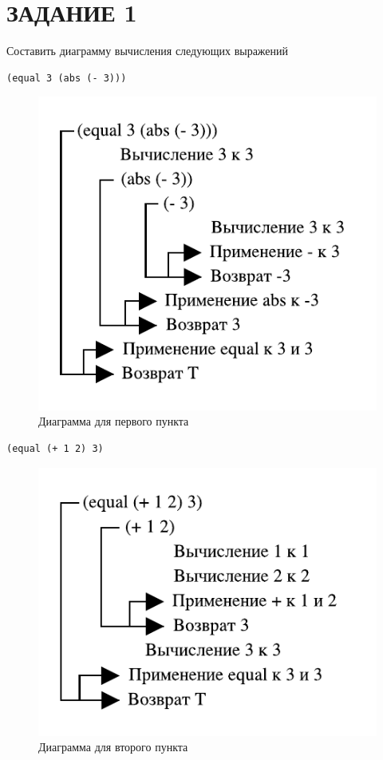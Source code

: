 \chapter{ЗАДАНИЕ 1}

Составить диаграмму вычисления следующих выражений

\begin{lstlisting}
(equal 3 (abs (- 3)))
\end{lstlisting}

\begin{figure}[H]
    \centering
    \includegraphics{img/01_01.pdf}
    \caption{Диаграмма для первого пункта}
\end{figure}

\begin{lstlisting}
(equal (+ 1 2) 3)
\end{lstlisting}

\begin{figure}[H]
    \centering
    \includegraphics{img/01_02.pdf}
    \caption{Диаграмма для второго пункта}
\end{figure}

